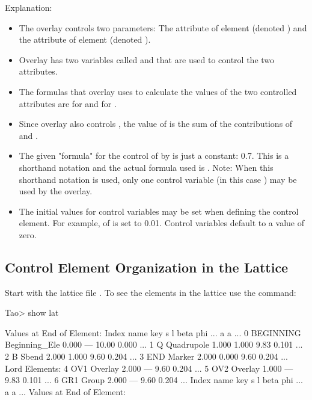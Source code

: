 \documentclass{hitec}     %
\begin{document}
{{{{Explanation:
\vspace{-5 pt}
\begin{itemize}[leftmargin=*]
%
\item
The overlay  controls two parameters: 
The  attribute of element  (denoted ) and the  attribute of element
 (denoted ).
\item
Overlay  has two variables called  and  that are used to control the two attributes.
\item
The formulas that overlay  uses to calculate the values of the two controlled
attributes are  for  and  for .
\item 
Since overlay  also controls , the value of  is the sum of the
contributions of  and .
\item
The given "formula" for the control of  by  is just a constant: 0.7.  This is a
shorthand notation and the actual formula used is .  Note: When this shorthand notation
is used, only one control variable (in this case ) may be used by the overlay.
\item
The initial values for control variables may be set when defining the control element. For example,
 of  is set to 0.01. Control variables default to a value of zero.
\end{itemize}

\subsection{Control Element Organization in the Lattice}

Start \tao with the lattice file . To see the elements in the lattice use the  command:
\begin{code}
Tao> show lat

      Values at End of Element:
 Index  name      key                       s       l    beta     phi ...
                                                            a       a ...
     0  BEGINNING Beginning_Ele         0.000     ---   10.00   0.000 ...
     1  Q         Quadrupole            1.000   1.000    9.83   0.101 ...
     2  B         Sbend                 2.000   1.000    9.60   0.204 ...
     3  END       Marker                2.000   0.000    9.60   0.204 ...
Lord Elements:
     4  OV1       Overlay               2.000     ---    9.60   0.204 ...
     5  OV2       Overlay               1.000     ---    9.83   0.101 ...
     6  GR1       Group                 2.000     ---    9.60   0.204 ...
 Index  name      key                       s       l    beta     phi ...
                                                            a       a ...
      Values at End of Element:
\end{code}

}}}}
\end{document}
